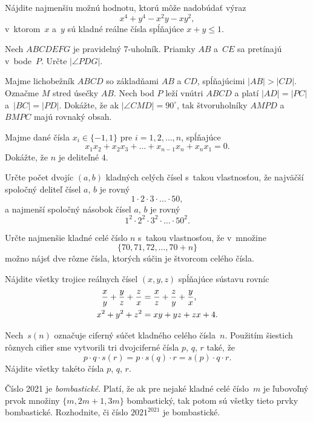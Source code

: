 {%
Nájdite najmenšiu možnú hodnotu, ktorú môže nadobúdať výraz
$$
x^4+y^4-x^2y-xy^2,
$$
v~ktorom~$x$ a~$y$ sú kladné reálne čísla spĺňajúce $x+y \le 1$.}

{%
Nech $ABCDEFG$ je pravidelný 7-uholník. Priamky $AB$ a~$CE$ sa pretínajú v~bode~$P$. Určte $|\angle PDG|$.}

{%
Majme lichobežník $ABCD$ so základňami $AB$ a $CD$, spĺňajúcimi $|AB|>|CD|$. Označme $M$ stred úsečky $AB$. Nech bod $P$ leží vnútri $ABCD$ a platí $|AD|=|PC|$ a~$|BC|=|PD|$. Dokážte, že ak $|\angle CMD|=90^\circ$, tak štvoruholníky $AMPD$ a $BMPC$ majú rovnaký obsah.}

{%
Majme dané čísla $x_i \in \{-1, 1\}$ pre $i = 1, 2, \ldots, n$, spĺňajúce
$$
x_1x_2+x_2x_3+\ldots+x_{n-1}x_n+x_nx_1=0.
$$
Dokážte, že $n$ je deliteľné $4$.}

{%
Určte počet dvojíc $(a,b)$ kladných celých čísel s~takou vlastnosťou, že najväčší spoločný deliteľ čísel $a$, $b$ je rovný
$$
1\cdot 2\cdot 3\cdot\ldots\cdot 50,
$$
a najmenší spoločný násobok čísel $a$, $b$ je rovný
$$
1^2\cdot 2^2\cdot 3^2\cdot\ldots\cdot 50^2.
$$
}

{%
Určte najmenšie kladné celé číslo $n$ s~takou vlastnosťou, že v~množine
$$
\{70, 71, 72, \ldots, 70 + n\}
$$
možno nájsť dve rôzne čísla, ktorých súčin je štvorcom celého čísla.}

{%
Nájdite všetky trojice reálnych čísel $(x,y,z)$ spĺňajúce sústavu rovníc
$$
\aligned
\frac{x}{y}+\frac{y}{z}+\frac{z}{x}&=\frac{x}{z}+\frac{z}{y}+\frac{y}{x},\\
x^2+y^2+z^2&=xy+yz+zx+4.
\endaligned
$$
}

{%
Nech~$s(n)$ označuje ciferný súčet kladného celého čísla~$n$. Použitím šiestich rôznych cifier sme vytvorili tri dvojciferné čísla $p$, $q$, $r$ také, že
$$
p\cdot q \cdot s(r) = p\cdot s(q)\cdot r = s(p)\cdot q\cdot r.
$$
Nájdite všetky takéto čísla $p$, $q$, $r$.
}

{%
Číslo 2021 je \emph{bombastické}. Platí, že ak pre nejaké kladné celé číslo~$m$ je ľubovoľný prvok množiny $\{m,2m+1,3m\}$ bombastický, tak potom sú všetky tieto prvky bombastické. Rozhodnite, či číslo $2021^{2021}$ je bombastické.
}

